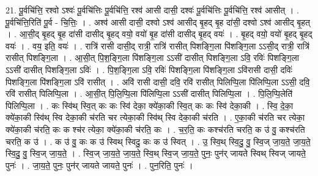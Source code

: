 \documentclass[17pt]{extarticle}
\begin{document}
21. पू॒र्वचि॑त्ति॒ रश्वो ऽश्वः॑ पू॒र्वचि॑त्तिः पू॒र्वचि॑त्ति॒ रश्व॑ आसी दासी॒ दश्वः॑ पू॒र्वचि॑त्तिः पू॒र्वचि॑त्ति॒ रश्व॑ आसीत् । . पू॒र्वचि॑त्ति॒रिति॑ पू॒र्व - चि॒त्तिः॒ । . अश्व॑ आसी दासी॒ दश्वो ऽश्व॑ आसीद् बृ॒हद् बृ॒ह दा॑सी॒ दश्वो ऽश्व॑ आसीद् बृ॒हत् । . आ॒सी॒द् बृ॒हद् बृ॒ह दा॑सी दासीद् बृ॒हद् वयो॒ वयो॑ बृ॒ह दा॑सी दासीद् बृ॒हद् वयः॑ । . बृ॒हद् वयो॒ वयो॑ बृ॒हद् बृ॒हद् वयः॑ । . वय॒ इति॒ वयः॑ । . रात्रि॑ रासी दासी॒द् रात्री॒ रात्रि॑ रासीत् पिशङ्गि॒ला पि॑शङ्गि॒ला ऽऽसी॒द् रात्री॒ रात्रि॑ रासीत् पिशङ्गि॒ला । . आ॒सी॒त् पि॒श॒ङ्गि॒ला पि॑शङ्गि॒ला ऽऽसी॑ दासीत् पिशङ्गि॒ला ऽवि॒ रविः॑ पिशङ्गि॒ला ऽऽसी॑ दासीत् पिशङ्गि॒ला ऽविः॑ । . पि॒श॒ङ्गि॒ला ऽवि॒ रविः॑ पिशङ्गि॒ला पि॑शङ्गि॒ला ऽवि॑रासी दासी॒ दविः॑ पिशङ्गि॒ला पि॑शङ्गि॒ला ऽवि॑ रासीत् । . अवि॑ रासी दासी॒ दवि॒ रवि॑ रासीत् पिलिप्पि॒ला पि॑लिप्पि॒ला ऽऽसी॒ दवि॒ रवि॑ रासीत् पिलिप्पि॒ला । . आ॒सी॒त् पि॒लि॒प्पि॒ला पि॑लिप्पि॒ला ऽऽसी॑ दासीत् पिलिप्पि॒ला । . पि॒लि॒प्पि॒लेति॑ पिलिप्पि॒ला । . कः स्वि॑थ् स्वि॒त् कः कः स्वि॑ देका॒ क्ये॑का॒की स्वि॒त् कः कः स्वि॑ देका॒की । . स्वि॒ दे॒का॒ क्ये॑का॒की स्वि॑थ् स्वि देका॒की च॑रति चर त्येका॒की स्वि॑थ् स्वि देका॒की च॑रति । . ए॒का॒की च॑रति चर त्येका॒ क्ये॑का॒की च॑रति॒ कः क श्च॑र त्येका॒ क्ये॑का॒की च॑रति॒ कः । . च॒र॒ति॒ कः कश्च॑रति चरति॒ क उ॑ वु॒ कश्च॑रति चरति॒ क उ॑ । . क उ॑ वु॒ कः क उ॑ स्विथ् स्विदु॒ कः क उ॑ स्वित् । . उ॒ स्वि॒थ् स्वि॒दु॒ वु॒ स्वि॒ज् जा॒य॒ते॒ जा॒य॒ते॒ स्वि॒दु॒ वु॒ स्वि॒ज् जा॒य॒ते॒ । . स्वि॒ज् जा॒य॒ते॒ जा॒य॒ते॒ स्वि॒थ् स्वि॒ज् जा॒य॒ते॒ पुनः॒ पुन॑र् जायते स्विथ् स्विज् जायते॒ पुनः॑ । . जा॒य॒ते॒ पुनः॒ पुन॑र् जायते जायते॒ पुनः॑ । . पुन॒रिति॒ पुनः॑ । \newline
\end{document}
